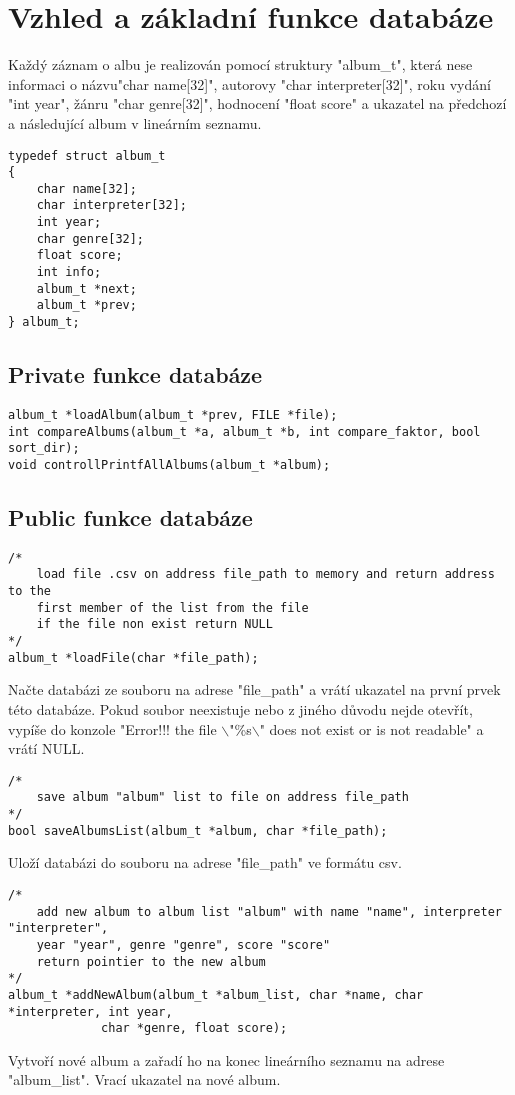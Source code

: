 \section{Vzhled a základní funkce databáze}
Každý záznam o albu je realizován pomocí struktury "album\_t", která nese informaci o názvu"char name[32]", autorovy "char interpreter[32]", roku vydání "int year", žánru "char genre[32]", hodnocení "float score" a ukazatel na předchozí a následující album v lineárním seznamu.
\begin{lstlisting}[style=CStyle]
typedef struct album_t
{
	char name[32];
	char interpreter[32];
	int year;
	char genre[32];
	float score;
	int info;
	album_t *next;
	album_t *prev;
} album_t;
\end{lstlisting}

\subsection{Private funkce databáze}
\begin{lstlisting}[style=CStyle]
album_t *loadAlbum(album_t *prev, FILE *file);
int compareAlbums(album_t *a, album_t *b, int compare_faktor, bool sort_dir);
void controllPrintfAllAlbums(album_t *album);
\end{lstlisting}

\subsection{Public funkce databáze}
\begin{lstlisting}[style=CStyle]
/*
	load file .csv on address file_path to memory and return address to the 
	first member of the list from the file 
    if the file non exist return NULL
*/
album_t *loadFile(char *file_path);
\end{lstlisting}
Načte databázi ze souboru na adrese "file\_path" a vrátí ukazatel na první prvek této databáze.
Pokud soubor neexistuje nebo z jiného důvodu nejde otevřít, vypíše do konzole "Error!!! the file $\backslash$"\%s$\backslash$" does not exist or is not readable" a vrátí NULL.

\begin{lstlisting}[style=CStyle]
/*
	save album "album" list to file on address file_path 
*/
bool saveAlbumsList(album_t *album, char *file_path);
\end{lstlisting}
Uloží databázi do souboru na adrese "file\_path" ve formátu csv.

\begin{lstlisting}[style=CStyle]
/*
	add new album to album list "album" with name "name", interpreter "interpreter",
	year "year", genre "genre", score "score"
	return pointier to the new album
*/
album_t *addNewAlbum(album_t *album_list, char *name, char *interpreter, int year, 
		     char *genre, float score);
\end{lstlisting}
Vytvoří nové album a zařadí ho na konec lineárního seznamu na adrese "album\_list".
Vrací ukazatel na nové album.

